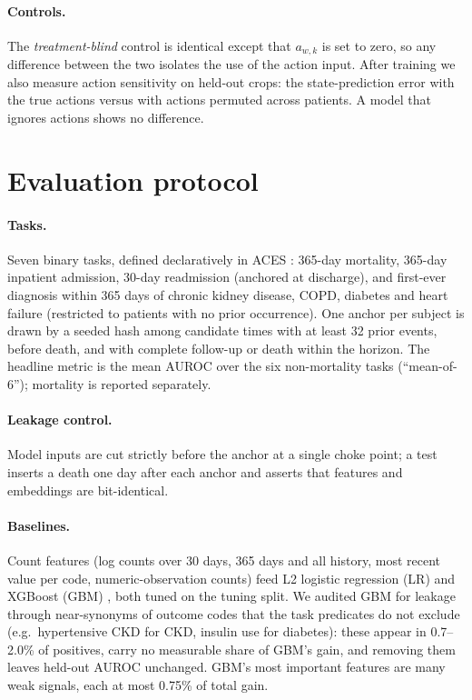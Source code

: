 \documentclass[10pt,letterpaper]{article}
\begin{document}
\paragraph{Controls.}
The \emph{treatment-blind} control is identical except that $a_{w,k}$ is set to
zero, so any difference between the two isolates the use of the action input.
After training we also measure action sensitivity on held-out crops: the
state-prediction error with the true actions versus with actions permuted
across patients. A model that ignores actions shows no difference.

\section{Evaluation protocol}
\label{sec:eval}

\paragraph{Tasks.}
Seven binary tasks, defined declaratively in ACES \citep{aces}: 365-day
mortality, 365-day inpatient admission, 30-day readmission (anchored at
discharge), and first-ever diagnosis within 365 days of chronic kidney
disease, COPD, diabetes and heart failure (restricted to patients with no prior
occurrence). One anchor per subject is drawn by a seeded hash among candidate
times with at least 32 prior events, before death, and with complete follow-up
or death within the horizon. The headline metric is the mean AUROC over the six
non-mortality tasks (``mean-of-6''); mortality is reported separately.

\paragraph{Leakage control.}
Model inputs are cut strictly before the anchor at a single choke point; a test
inserts a death one day after each anchor and asserts that features and
embeddings are bit-identical.

\paragraph{Baselines.}
Count features (log counts over 30 days, 365 days and all history, most recent
value per code, numeric-observation counts) feed L2 logistic regression (LR) and
XGBoost (GBM) \citep{xgboost}, both tuned on the tuning split. We audited GBM
for leakage through near-synonyms of outcome codes that the task predicates do not
exclude (e.g.\ hypertensive CKD for CKD, insulin use for diabetes): these appear
in 0.7--2.0\% of positives, carry no measurable share of GBM's gain, and removing
them leaves held-out AUROC unchanged. GBM's most important features are many
weak signals, each at most 0.75\% of total gain.
\end{document}
